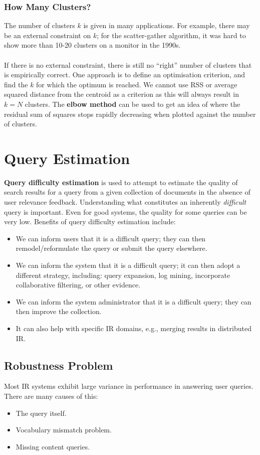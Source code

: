 \documentclass[a4paper,11pt]{article}
\begin{document}
\subsubsection{How Many Clusters?}
The number of clusters $k$ is given in many applications.
For example, there may be an external constraint on $k$; for the scatter-gather algorithm, it was hard to show more than 10-20 clusters on a monitor in the 1990s.
\\\\
If there is no external constraint, there is still no ``right'' number of clusters that is empirically correct.
One approach is to define an optimisation criterion, and find the $k$ for which the optimum is reached.
We cannot use RSS or average squared distance from the centroid as a criterion as this will always result in $k = N$ clusters.
The \textbf{elbow method} can be used to get an idea of where the residual sum of squares stops rapidly decreasing when plotted against the number of clusters.



\section{Query Estimation}
\textbf{Query difficulty estimation} is used to attempt to estimate the quality of search results for a query from a given collection of documents in the absence of user relevance feedback.
Understanding what constitutes an inherently \textit{difficult} query is important.
Even for good systems, the quality for some queries can be very low.
Benefits of query difficulty estimation include:
\begin{itemize}
    \item   We can inform users that it is a difficult query;
            they can then remodel/reformulate the query or submit the query elsewhere.
    \item   We can inform the system that it is a difficult query;
            it can then adopt a different strategy, including: query expansion, log mining, incorporate collaborative filtering, or other evidence.
    \item   We can inform the system administrator that it is a difficult query; they can then improve the collection.
    \item   It can also help with specific IR domains, e.g., merging results in distributed IR.
\end{itemize}

\subsection{Robustness Problem}
Most IR systems exhibit large variance in performance in answering user queries.
There are many causes of this:
\begin{itemize}
    \item   The query itself.
    \item   Vocabulary mismatch problem.
    \item   Missing content queries.
\end{itemize}
\end{document}
